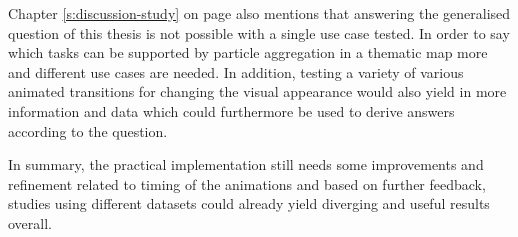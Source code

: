 Chapter \ref{s:discussion-study} on page \pageref{s:discussion-study} also mentions that answering the generalised question of this thesis is not possible with a single use case tested. In order to say which tasks can be supported by particle aggregation in a thematic map more and different use cases are needed. In addition, testing a variety of various animated transitions for changing the visual appearance would also yield in more information and data which could furthermore be used to derive answers according to the question.

In summary, the practical implementation still needs some improvements and refinement related to timing of the animations and based on further feedback, studies using different datasets could already yield diverging and useful results overall.
